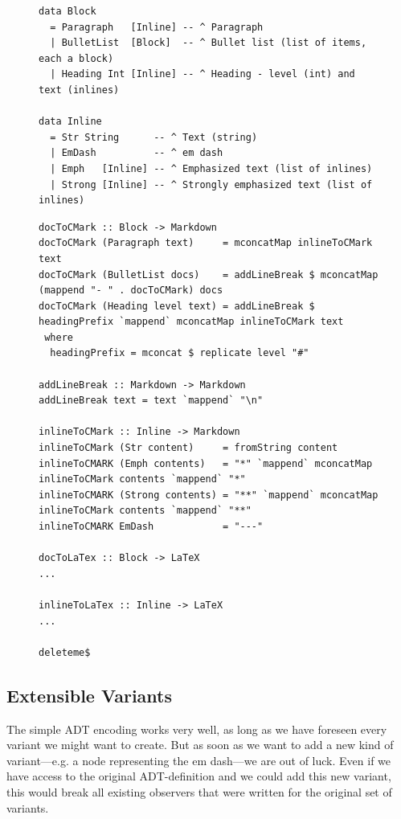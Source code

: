 \begin{figure}
\begin{lstlisting}
data Block
  = Paragraph   [Inline] -- ^ Paragraph
  | BulletList  [Block]  -- ^ Bullet list (list of items, each a block)
  | Heading Int [Inline] -- ^ Heading - level (int) and text (inlines)
  
data Inline
  = Str String      -- ^ Text (string)
  | EmDash          -- ^ em dash
  | Emph   [Inline] -- ^ Emphasized text (list of inlines)
  | Strong [Inline] -- ^ Strongly emphasized text (list of inlines)
\end{lstlisting}
\end{figure}

\begin{figure}
\begin{lstlisting}
docToCMark :: Block -> Markdown
docToCMark (Paragraph text)     = mconcatMap inlineToCMark text
docToCMark (BulletList docs)    = addLineBreak $ mconcatMap (mappend "- " . docToCMark) docs
docToCMark (Heading level text) = addLineBreak $ headingPrefix `mappend` mconcatMap inlineToCMark text
 where
  headingPrefix = mconcat $ replicate level "#"

addLineBreak :: Markdown -> Markdown
addLineBreak text = text `mappend` "\n"

inlineToCMark :: Inline -> Markdown
inlineToCMark (Str content)     = fromString content
inlineToCMARK (Emph contents)   = "*" `mappend` mconcatMap inlineToCMark contents `mappend` "*"
inlineToCMARK (Strong contents) = "**" `mappend` mconcatMap inlineToCMark contents `mappend` "**"
inlineToCMARK EmDash            = "---"

docToLaTex :: Block -> LaTeX
...

inlineToLaTex :: Inline -> LaTeX
...

deleteme$
\end{lstlisting}
\end{figure}

\clearpage

\subsection{Extensible Variants}

The simple ADT encoding works very well, as long as we have foreseen every
variant we might want to create. But as soon as we want to add a new kind of
variant—e.g. a node representing the em dash—we are out of luck. Even if we
have access to the original ADT-definition and we could add this new variant,
this would break all existing observers that were written for the original set
of variants.

